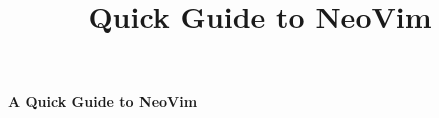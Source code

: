 \documentclass[10pt,landscape]{article}
\title{Quick Guide to NeoVim}
\begin{document}
    \frenchspacing
    \raggedright
    \footnotesize

    \begin{center}
        \Large{\textbf{A Quick Guide to NeoVim}} \\
    \end{center}
    \begin{multicols}{3}
        \setlength{\premulticols}{1pt}
        \setlength{\postmulticols}{1pt}
        \setlength{\multicolsep}{1pt}
        \setlength{\columnsep}{2pt}

        
        

    \end{multicols}
\end{document}
